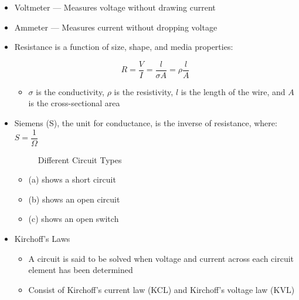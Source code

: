 \begin{itemize}

  \item Voltmeter — Measures voltage without drawing current

  \item Ammeter — Measures current without dropping voltage

  \item Resistance is a function of size, shape, and media properties:

    $$\boxed{R=\frac{V}{I}=\frac{l}{\sigma A}=\rho\frac{l}{A}}$$

    \begin{itemize}

      \item $\sigma$ is the conductivity, $\rho$ is the resistivity, $l$ is the length of the wire, and $A$ is the cross-sectional area

    \end{itemize}

  \item Siemens (S), the unit for conductance, is the inverse of resistance, where: $\boxed{S=\dfrac{1}{\Omega}}$

    \begin{figure}[h!]
      \centering
      
      \caption{Different Circuit Types}
      \label{fig:1}
    \end{figure}

    \begin{itemize}

      \item (a) shows a short circuit

      \item (b) shows an open circuit

      \item (c) shows an open switch

    \end{itemize}

  \item Kirchoff's Laws

    \begin{itemize}

      \item A circuit is said to be solved when voltage and current across each circuit element has been determined

      \item Consist of Kirchoff's current law (KCL) and Kirchoff's voltage law (KVL)


\end{itemize}
\end{itemize}
